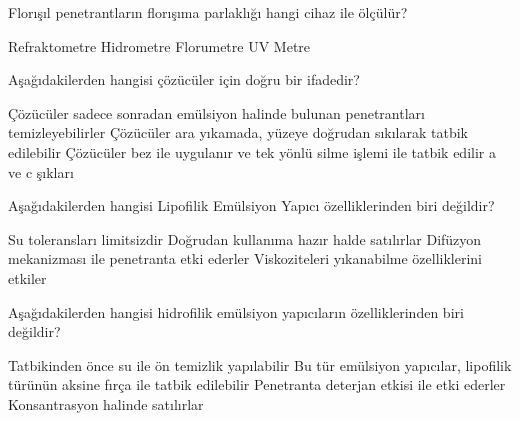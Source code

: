 \begin{question}[subtitle=]
Florışıl penetrantların florışıma parlaklığı hangi cihaz ile ölçülür?
	\begin{tasks}
          \task Refraktometre
          \task Hidrometre
          \task Florumetre \correct
          \task UV Metre
	\end{tasks}
\end{question}
\begin{solution}
	\correct
\end{solution}

\begin{question}[subtitle=]
Aşağıdakilerden hangisi çözücüler için doğru bir ifadedir?
	\begin{tasks}
          \task Çözücüler sadece sonradan emülsiyon halinde bulunan penetrantları temizleyebilirler
          \task Çözücüler ara yıkamada, yüzeye doğrudan sıkılarak tatbik edilebilir
          \task Çözücüler bez ile uygulanır ve tek yönlü silme işlemi ile tatbik edilir \correct
          \task a ve c şıkları
	\end{tasks}
\end{question}
\begin{solution}
	\correct
\end{solution}

\begin{question}[subtitle=]
Aşağıdakilerden hangisi Lipofilik Emülsiyon Yapıcı özelliklerinden biri değildir?
	\begin{tasks}
          \task Su toleransları limitsizdir \correct
          \task Doğrudan kullanıma hazır halde satılırlar
          \task Difüzyon mekanizması ile penetranta etki ederler
          \task Viskoziteleri yıkanabilme özelliklerini etkiler
	\end{tasks}
\end{question}
\begin{solution}
	\correct
\end{solution}

\begin{question}[subtitle=]
Aşağıdakilerden hangisi hidrofilik emülsiyon yapıcıların özelliklerinden biri değildir?
	\begin{tasks}
          \task Tatbikinden önce su ile ön temizlik yapılabilir
          \task Bu tür emülsiyon yapıcılar, lipofilik türünün aksine fırça ile tatbik edilebilir \correct
          \task Penetranta deterjan etkisi ile etki ederler
          \task Konsantrasyon halinde satılırlar
	\end{tasks}
\end{question}
\begin{solution}
	\correct
\end{solution}

